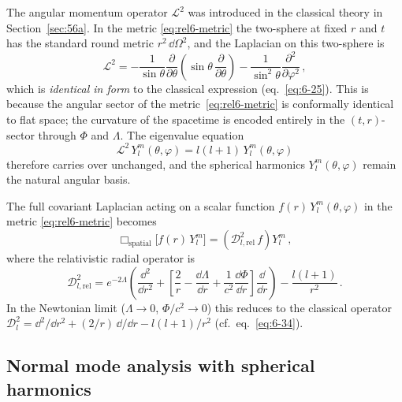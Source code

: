 The angular momentum operator $\mathscr{L}^{2}$ was introduced in the
classical theory in Section~\ref{sec:56a}.  In the metric
\eqref{eq:rel6-metric} the two-sphere at fixed $r$ and $t$ has the
standard round metric $r^{2}\,\dd\Omega^{2}$, and the Laplacian on this
two-sphere is
\begin{equation}
  \mathscr{L}^{2}
  = -\frac{1}{\sin\theta}\frac{\partial}{\partial\theta}\!\left(
      \sin\theta\,\frac{\partial}{\partial\theta}
    \right)
    - \frac{1}{\sin^{2}\!\theta}\frac{\partial^{2}}{\partial\varphi^{2}} \,,
  \label{eq:rel6-L2}
\end{equation}
which is \emph{identical in form} to the classical expression
(eq.~\eqref{eq:6-25}).  This is because the angular sector of the
metric~\eqref{eq:rel6-metric} is conformally identical to flat space;
the curvature of the spacetime is encoded entirely in the
$(t,r)$-sector through $\Phi$ and $\Lambda$.  The eigenvalue equation
\begin{equation}
  \mathscr{L}^{2}\,Y_{l}^{m}(\theta,\varphi)
  = l(l+1)\,Y_{l}^{m}(\theta,\varphi)
  \label{eq:rel6-L2-eigen}
\end{equation}
therefore carries over unchanged, and the spherical harmonics
$Y_{l}^{m}(\theta,\varphi)$ remain the natural angular basis.

The full covariant Laplacian acting on a scalar function
$f(r)\,Y_{l}^{m}(\theta,\varphi)$ in the metric
\eqref{eq:rel6-metric} becomes
\begin{equation}
  \Box_{\mathrm{spatial}}\bigl[f(r)\,Y_{l}^{m}\bigr]
  = \left(\mathscr{D}_{l,\mathrm{rel}}^{2}\,f\right) Y_{l}^{m} \,,
  \label{eq:rel6-scalar-lap}
\end{equation}
where the relativistic radial operator is
\begin{equation}
  \mathscr{D}_{l,\mathrm{rel}}^{2}
  = e^{-2\Lambda}\!\left(
      \frac{\dd^{2}}{\dd r^{2}}
      + \left[\frac{2}{r} - \frac{\dd\Lambda}{\dd r}
              + \frac{1}{c^{2}}\frac{\dd\Phi}{\dd r}\right]
        \frac{\dd}{\dd r}
    \right)
    - \frac{l(l+1)}{r^{2}} \,.
  \label{eq:rel6-Dlrel}
\end{equation}
In the Newtonian limit ($\Lambda \to 0$, $\Phi/c^{2}\to 0$)
this reduces to the classical operator
$\mathscr{D}_{l}^{2} = \dd^{2}/\dd r^{2}
  + (2/r)\,\dd/\dd r - l(l+1)/r^{2}$
(cf.\ eq.~\eqref{eq:6-34}).

\subsection{Normal mode analysis with spherical harmonics}
\label{subsec:rel-56-modes}

